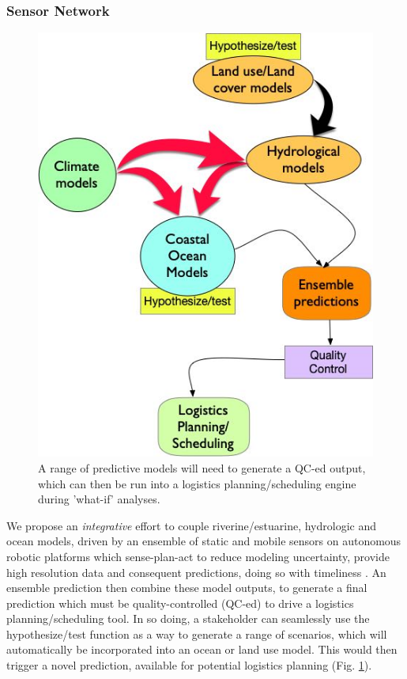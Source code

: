 \subsubsection*{Sensor Network}


\begin{figure}
  \centering
  \includegraphics[scale=0.30]{fig/process.jpg}
  \caption{A range of predictive models will need to generate a QC-ed
    output, which can then be run into a logistics planning/scheduling
    engine during 'what-if' analyses.}
  \label{fig:process}
\end{figure}

We propose an \emph{integrative} effort to couple riverine/estuarine,
hydrologic and ocean models, driven by an ensemble of static and
mobile sensors on autonomous robotic platforms which sense-plan-act to
reduce modeling uncertainty, provide high resolution data and
consequent predictions, doing so with timeliness . An ensemble prediction then
combine these model outputs, to generate a final prediction which must
be quality-controlled (QC-ed) to drive a logistics planning/scheduling
tool. In so doing, a stakeholder can seamlessly use the
hypothesize/test function as a way to generate a range of scenarios,
which will automatically be incorporated into an ocean or land use
model. This would then trigger a novel prediction, available for
potential logistics planning (Fig. \ref{fig:process}).

